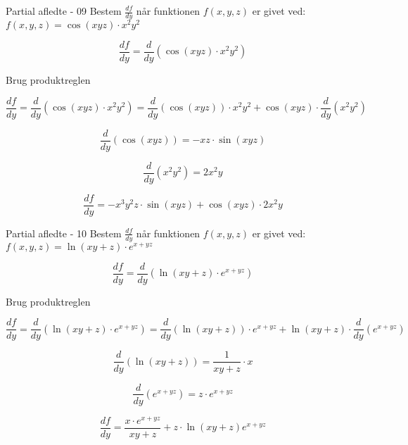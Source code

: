\documentclass{article}
\begin{document}
\begin{exercise}{Partial afledte - 09}
	Bestem $\frac{df}{dy}$ når funktionen $f(x,y,z)$ er givet ved:
	$f(x,y,z) = \cos(xyz) \cdot x^2 y^2$ 
	
	
	\hint
	\[
	\frac{df}{dy} = \frac{d}{dy} \left(\cos(xyz) \cdot x^2 y^2\right) 
	\]
	
	\hint
	Brug produktreglen
	
	\hint
	\[
	\frac{df}{dy} = \frac{d}{dy} \left( \cos(xyz) \cdot x^2 y^2\right) = \frac{d}{dy} \left( \cos(xyz) \right) \cdot x^2 y^2 + \cos(xyz) \cdot \frac{d}{dy}\left( x^2 y^2\right)
	\]
	
	\hint
	\[
	\frac{d}{dy} \left( \cos(xyz) \right) = -xz \cdot \sin(xyz)
	\]
	
	\hint
	\[
	\frac{d}{dy}\left( x^2 y^2\right) =2x^2 y
	\]
	
	\hint
	\[
	\frac{df}{dy}  = -x^3y^2 z \cdot  \sin(xyz)+ \cos(xyz) \cdot 2x^2 y
	\]
	
	
\end{exercise}

\begin{exercise}{Partial afledte - 10}
	Bestem $\frac{df}{dy}$ når funktionen $f(x,y,z)$ er givet ved:
	$f(x,y,z) = \ln(xy+z) \cdot e^{x+yz}$ 
	
	
	\hint
	\[
	\frac{df}{dy} = \frac{d}{dy} \left(\ln(xy+z) \cdot e^{x+yz}\right) 
	\]
	
	\hint
	Brug produktreglen
	
	\hint
	\[
	\frac{df}{dy} = \frac{d}{dy} \left( \ln(xy+z) \cdot e^{x+yz}\right) = \frac{d}{dy} \left( \ln(xy+z) \right) \cdot e^{x+yz} + \ln(xy+z) \cdot \frac{d}{dy}\left( e^{x+yz} \right)
	\]
	
	\hint
	\[
	\frac{d}{dy} \left( \ln(xy+z)\right) = \frac{1}{xy+z} \cdot x
	\]
	
	\hint
	\[
	\frac{d}{dy}\left( e^{x+yz} \right) = z \cdot e^{x+yz}
	\]
	
	\hint
	\[
	\frac{df}{dy}  = \frac{x \cdot e^{x+yz}}{xy+z} + z \cdot \ln(xy+z) e^{x+yz}
	\]
	
	
\end{exercise}
\end{document}
